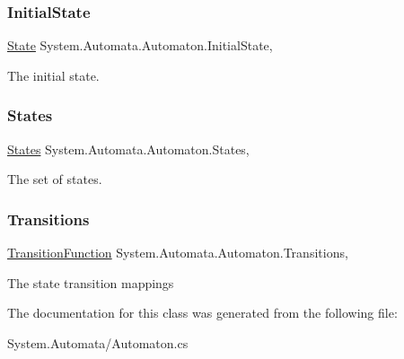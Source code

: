 \subsubsection{\texorpdfstring{Initial\+State}{InitialState}}
{\footnotesize\ttfamily \mbox{\hyperlink{class_system_1_1_automata_1_1_state}{State}} System.\+Automata.\+Automaton.\+Initial\+State\hspace{0.3cm}{\ttfamily [get]}, {}}



The initial state. 

\mbox{\label{class_system_1_1_automata_1_1_automaton_a21fc2f1e7cf4ee121de2547dc184dedf}} 
\subsubsection{\texorpdfstring{States}{States}}
{\footnotesize\ttfamily \mbox{\hyperlink{class_system_1_1_automata_1_1_states}{States}} System.\+Automata.\+Automaton.\+States\hspace{0.3cm}{\ttfamily [get]}, {}}



The set of states. 

\mbox{\label{class_system_1_1_automata_1_1_automaton_ae109aca0f6f80efc50e9553cfe250ce5}} 
\subsubsection{\texorpdfstring{Transitions}{Transitions}}
{\footnotesize\ttfamily \mbox{\hyperlink{class_system_1_1_automata_1_1_transition_function}{Transition\+Function}} System.\+Automata.\+Automaton.\+Transitions\hspace{0.3cm}{\ttfamily [get]}, {}}



The state transition mappings 



The documentation for this class was generated from the following file\+:\begin{DoxyCompactItemize}
\item 
System.\+Automata/Automaton.\+cs\end{DoxyCompactItemize}

